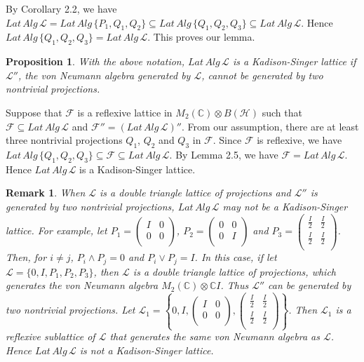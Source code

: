 \documentclass[12pt]{article}
\newtheorem{prop}{Proposition}[section]
\newtheorem{remark}{Remark}[section]
\newcommand{\HHH}{\mathcal H} %
\newcommand{\LLL}{\mathcal L} %
\newcommand{\C}{\mathbb C} %
\def\L{{\mathcal{L}}}
\begin{document}
{By Corollary 2.2, we have $Lat\,Alg\,\L=Lat\,Alg\,\{P_1, Q_1,
Q_2\}\subseteq Lat\,Alg\,\{Q_1, Q_2, Q_3\}\subseteq Lat\,Alg\,\L$.
Hence $Lat\,Alg\,\{Q_1, Q_2, Q_3\}= Lat\,Alg\,\L$. This proves our
lemma.


\begin{prop} With the above notation,
 $Lat\,Alg\,\LLL$ is  a Kadison-Singer
 lattice if $\LLL''$, the von Neumann algebra generated by $\LLL$, cannot be generated by two nontrivial
 projections.
\end{prop}

 \quad Suppose that $\mathcal{F}$ is a reflexive lattice in
 $M_2(\C)\otimes B(\HHH)$ such that $\mathcal{F}\subseteq Lat\,Alg\,\L$ and $\mathcal{F}''=(Lat\,Alg\,\L)''$.
 From our assumption, there are at least three nontrivial projections
 $Q_1$, $Q_2$ and $Q_3$ in $\mathcal{F}$. Since $\mathcal{F}$ is reflexive, we have $Lat\,Alg\,\{Q_1,Q_2,Q_3\}\subseteq\mathcal{F}\subseteq
 Lat\,Alg\,\L$. By Lemma 2.5, we have $\mathcal{F}=Lat\,Alg\,\L$. Hence
 $Lat\,Alg\,\LLL$ is a Kadison-Singer lattice.


\begin{remark} When $\LLL$ is a double triangle lattice of projections and $\LLL''$ is generated by two nontrivial projections,
$Lat\,Alg\,\L$ may not be a Kadison-Singer lattice. For example, let
$P_1=\left(
     \begin{array}{cc}
     I & 0 \\
       0 & 0 \\
     \end{array}
   \right)$, $P_2=\left(
     \begin{array}{cc}
     0 & 0 \\
       0 & I \\
     \end{array}
   \right)$ and $P_3=\left(
     \begin{array}{cc}
     \frac I2 &\frac I2 \\
      \frac I2 & \frac I2 \\
     \end{array}
   \right)$. Then, for $i\neq j$, $P_i\wedge P_j=0$ and $P_i\vee P_j=I$. In this case, if let $\L=\{0,I,P_1,P_2,P_3\}$,
   then $\L$ is a double triangle lattice of projections, which generates the von Neumann algebra $M_2(\C)\otimes \C I$.
   Thus $\L''$ can be generated by two nontrivial
   projections. Let $\LLL_1=\left\{0, I,\left(
     \begin{array}{cc}
     I & 0 \\
       0 & 0 \\
     \end{array}
   \right), \left(
     \begin{array}{cc}
     \frac I2 &\frac I2 \\
      \frac I2 & \frac I2 \\
     \end{array}
   \right)\right\}$. Then $\L_1$ is a reflexive sublattice of $\LLL$ that generates the same von Neumann
   algebra as $\LLL$. Hence $Lat\,Alg\,\LLL$ is not a Kadison-Singer
 lattice.
\end{remark}

}
\end{document}

